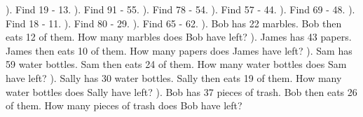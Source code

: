 \documentclass{article}%
\begin{document}
\newline%
). Find 19 {-} 13.%
\newline%
\newline%
). Find 91 {-} 55.%
\newline%
\newline%
). Find 78 {-} 54.%
\newline%
\newline%
). Find 57 {-} 44.%
\newline%
\newline%
). Find 69 {-} 48.%
\newline%
\newline%
). Find 18 {-} 11.%
\newline%
\newline%
). Find 80 {-} 29.%
\newline%
\newline%
). Find 65 {-} 62.%
\newline%
\newline%
). Bob has 22 marbles. Bob then eats 12 of them. How many marbles does Bob have left?%
\newline%
\newline%
). James has 43 papers. James then eats 10 of them. How many papers does James have left?%
\newline%
\newline%
). Sam has 59 water bottles. Sam then eats 24 of them. How many water bottles does Sam have left?%
\newline%
\newline%
). Sally has 30 water bottles. Sally then eats 19 of them. How many water bottles does Sally have left?%
\newline%
\newline%
). Bob has 37 pieces of trash. Bob then eats 26 of them. How many pieces of trash does Bob have left?%
\newline%
\end{document}
